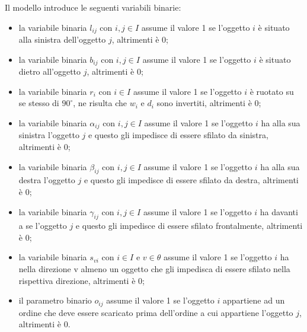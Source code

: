 Il modello introduce le seguenti variabili binarie:
\begin{itemize}
	\item la variabile binaria $l_{ij}$ con $i,j \in I$ assume il valore 1 se l'oggetto $i$ è situato alla sinistra dell'oggetto $j$, altrimenti è 0;
	\item la variabile binaria $b_{ij}$ con $i,j \in I$ assume il valore 1 se l'oggetto $i$ è situato dietro all'oggetto $j$, altrimenti è 0;
	\item la variabile binaria $r_{i}$ con $i \in I$ assume il valore 1 se l'oggetto $i$ è ruotato su se stesso di $90^{\circ}$, ne risulta che $w_{i}$ e $d_{i}$ sono invertiti, altrimenti è 0;
	\item la variabile binaria $\alpha_{ij}$ con $i,j \in I$ assume il valore 1 se l'oggetto $i$ ha alla sua sinistra l'oggetto $j$ e questo gli impedisce di essere sfilato da sinistra, altrimenti è 0;
	\item la variabile binaria $\beta_{ij}$ con $i,j \in I$ assume il valore 1 se l'oggetto $i$ ha alla sua destra l'oggetto $j$ e questo gli impedisce di essere sfilato da destra, altrimenti è 0;
	\item la variabile binaria $\gamma_{ij}$ con $i,j \in I$ assume il valore 1 se l'oggetto $i$ ha davanti a se l'oggetto $j$ e questo gli impedisce di essere sfilato frontalmente, altrimenti è 0;
	\item la variabile binaria $s_{vi}$ con $i \in I$ e $v \in \theta$ assume il valore 1 se l'oggetto $i$ ha nella direzione v almeno un oggetto che gli impedisca di essere sfilato nella rispettiva direzione, altrimenti è 0;
	\item il parametro binario $o_{ij}$ assume il valore 1 se l'oggetto $i$ appartiene ad un ordine che deve essere scaricato prima dell'ordine a cui appartiene l'oggetto $j$, altrimenti è 0.
\end{itemize}

